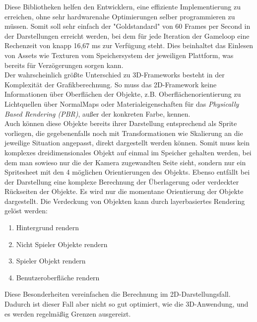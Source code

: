 Diese Bibliotheken helfen den Entwicklern, eine effiziente Implementierung zu erreichen, ohne sehr hardwarenahe Optimierungen selber programmieren zu müssen. Somit soll sehr einfach der "Goldstandard" von 60 Frames per Second in der Darstellungen erreicht werden, bei dem für jede Iteration der Gameloop eine Rechenzeit von knapp 16,67 ms zur Verfügung steht. Dies beinhaltet das Einlesen von Assets wie Texturen vom Speichersystem der jeweiligen Plattform, was bereits für Verzögerungen sorgen kann.\\ 
Der wahrscheinlich größte Unterschied zu 3D-Frameworks besteht in der Komplexität der Grafikberechnung. So muss das 2D-Framework keine Informationen über Oberflächen der Objekte, z.B. Oberflächenorientierung zu Lichtquellen über NormalMaps oder Materialeigenschaften für das \emph{Physically Based Rendering (PBR)}, außer der konkreten Farbe, kennen.\\
Auch können diese Objekte bereits ihrer Darstellung entsprechend als Sprite vorliegen, die gegebenenfalls noch mit Transformationen wie Skalierung an die jeweilige Situation  angepasst, direkt dargestellt werden können. Somit muss kein komplexes dreidimensionales Objekt auf einmal im Speicher gehalten werden, bei dem man sowieso nur die der Kamera zugewandten Seite sieht, sondern nur ein Spritesheet mit den 4 möglichen Orientierungen des Objekts.
Ebenso entfällt bei der Darstellung eine komplexe Berechnung der Überlagerung oder verdeckter Rückseiten der Objekte. Es wird nur die momentane Orientierung der Objekte dargestellt. Die Verdeckung von Objekten kann durch layerbasiertes Rendering gelöst werden:
\begin{enumerate}
\item Hintergrund rendern\\
\item Nicht Spieler Objekte rendern\\
\item Spieler Objekt rendern\\
\item Benutzeroberfläche rendern\\
\end{enumerate}
Diese Besonderheiten vereinfachen die Berechnung im 2D-Darstellungsfall. Dadurch ist dieser Fall aber nicht so gut optimiert, wie die 3D-Anwendung, und es werden regelmäßig Grenzen ausgereizt.

